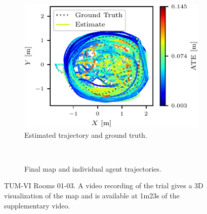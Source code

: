 \begin{figure}[h]
    \centering
    \captionsetup{format=plain}
    \begin{subfigure}[t]{0.5\linewidth}
        \centering
        \includegraphics[width=\linewidth]{figures/apr11_tum_room_trajectory_a_trajectory.pdf}
        \caption{Estimated trajectory and ground truth.}
    \end{subfigure}\hfill%
    ~
    \begin{subfigure}[t]{0.45\linewidth}
        \centering
        \caption{Final map and individual agent trajectories.}
    \end{subfigure}

    \caption{TUM-VI Rooms 01-03. A video recording of the trial gives a 3D visualization of the map and is available at 1m23s  of the supplementary video\protect\footnotemark[1].}
    \label{fig:tum-traj}
\end{figure}


